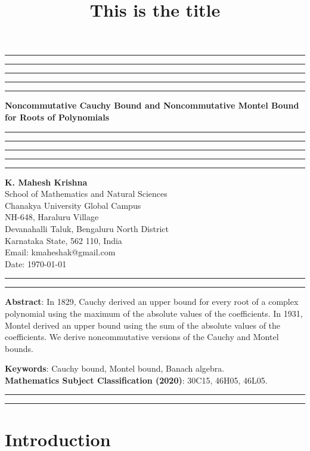 \documentclass{amsart}
\title{This is the title}
\begin{document}
\hrule\hrule\hrule\hrule\hrule
\vspace{0.3cm}	
\begin{center}
{\bf\large{{Noncommutative Cauchy Bound and Noncommutative Montel Bound for Roots of Polynomials}}}\\
\vspace{0.3cm}
\hrule\hrule\hrule\hrule\hrule
\vspace{0.3cm}
\textbf{K. Mahesh Krishna}\\
School of Mathematics and Natural Sciences\\
Chanakya University Global Campus\\
NH-648, Haraluru Village\\
Devanahalli Taluk, 	Bengaluru  North District\\
Karnataka State, 562 110, India\\
Email: kmaheshak@gmail.com\\

Date: \today
\end{center}

\hrule\hrule
\vspace{0.5cm}
\textbf{Abstract}: In 1829, Cauchy derived an upper bound for every root of a complex polynomial using the maximum of the absolute values of the coefficients. In 1931, Montel derived an upper bound using the sum of the absolute values of the coefficients. We derive noncommutative versions of the Cauchy and Montel bounds.


\textbf{Keywords}: Cauchy bound, Montel bound, Banach algebra.\\
\textbf{Mathematics Subject Classification (2020)}: 30C15, 46H05, 46L05.\\

\hrule


\hrule
\section{Introduction}
\end{document}

